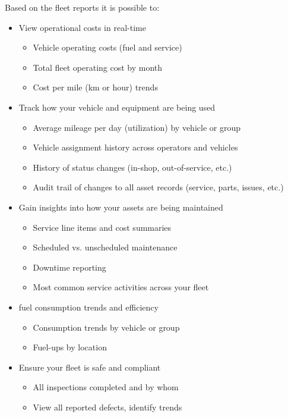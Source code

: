 \begin{description}
    Based on the fleet reports it is possible to:
    \begin{itemize}
    \item View operational costs in real-time
        \begin{itemize}
            \item Vehicle operating costs (fuel and service)
             \item Total fleet operating cost by month
             \item Cost per mile (km or hour) trends
        \end{itemize}
    \item Track how your vehicle and equipment are being used
        \begin{itemize}
            \item Average mileage per day (utilization) by vehicle or group
            \item Vehicle assignment history across operators and vehicles
            \item History of status changes (in-shop, out-of-service, etc.)
            \item Audit trail of changes to all asset records (service, parts, issues, etc.)
        \end{itemize}
    \item 	Gain insights into how your assets are being maintained
        \begin{itemize}
            \item Service line items and cost summaries
            \item Scheduled vs. unscheduled maintenance
            \item Downtime reporting
            \item Most common service activities across your fleet
        \end{itemize}
    \item 	fuel consumption trends and efficiency
        \begin{itemize}
            \item Consumption trends by vehicle or group
            \item Fuel-ups by location
        \end{itemize}
    \item Ensure your fleet is safe and compliant
        \begin{itemize}
            \item All inspections completed and by whom
            \item View all reported defects, identify trends 

\end{itemize}
\end{itemize}
\end{description}
